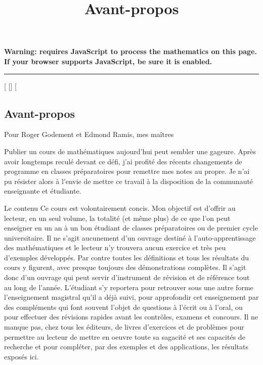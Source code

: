 \documentclass[]{article}
\title{Avant-propos}
\author{}
\date{}
\begin{document}
\maketitle

\textbf{Warning: 
requires JavaScript to process the mathematics on this page.\\ If your
browser supports JavaScript, be sure it is enabled.}

\begin{center}\rule{3in}{0.4pt}\end{center}

[
[]
[

\subsection{Avant-propos}

Pour Roger Godement et Edmond Ramis, mes maîtres

Publier un cours de mathématiques aujourd'hui peut sembler une gageure.
Après avoir longtemps reculé devant ce défi, j'ai profité des récents
changements de programme en classes préparatoires pour remettre mes
notes au propre. Je n'ai pu résister alors à l'envie de mettre ce
travail à la disposition de la communauté enseignante et étudiante.

Le contenu Ce cours est volontairement concis. Mon objectif est d'offrir
au lecteur, en un seul volume, la totalité (et même plus) de ce que l'on
peut enseigner en un an à un bon étudiant de classes préparatoires ou de
premier cycle universitaire. Il ne s'agit aucunement d'un ouvrage
destiné à l'auto-apprentissage des mathématiques et le lecteur n'y
trouvera aucun exercice et très peu d'exemples développés. Par contre
toutes les définitions et tous les résultats du cours y figurent, avec
presque toujours des démonstrations complètes. Il s'agit donc d'un
ouvrage qui peut servir d'instrument de révision et de référence tout au
long de l'année. L'étudiant s'y reportera pour retrouver sous une autre
forme l'enseignement magistral qu'il a déjà suivi, pour approfondir cet
enseignement par des compléments qui font souvent l'objet de questions à
l'écrit ou à l'oral, ou pour effectuer des révisions rapides avant les
contrôles, examens et concours. Il ne manque pas, chez tous les
éditeurs, de livres d'exercices et de problèmes pour permettre au
lecteur de mettre en oeuvre toute sa sagacité et ses capacités de
recherche et pour compléter, par des exemples et des applications, les
résultats exposés ici.
\end{document}
